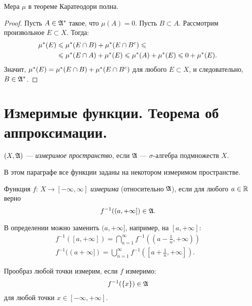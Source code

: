 \begin{remrk}
 Мера $\mu$ в теореме Каратеодори полна.
\end{remrk}
\begin{proof}
 Пусть $A \in \mathfrak{A}^{\ast}$ такое, что $\mu(A) = 0$. Пусть  $B \subset A$. Рассмотрим произвольное $E \subset X$. Тогда:
 \begin{align*}
  \mu^\ast(E) & \leqslant \mu^\ast(E \cap B) + \mu^\ast(E \cap B^{c}) \leqslant \\
  & \leqslant \mu^\ast(E \cap A) + \mu^\ast(E) \leqslant \mu^\ast(A) + \mu^\ast(E) \leqslant 0 + \mu^\ast(E)
 .\end{align*} Значит, $\mu^\ast(E) = \mu^\ast(E \cap B) + \mu^\ast(E \cap B^{c})$ для любого $E \subset X$, и следовательно, $B \in \mathfrak{A}^{\ast}$.
\end{proof}
\section{Измеримые функции. Теорема об аппроксимации.}
\begin{df}
 $(X, \mathfrak{A})$ --- \textit{измеримое пространство}, если  $\mathfrak{A}$ ---  $\sigma$-алгебра подмножеств $X$.
\end{df}
В этом параграфе все функции заданы на некотором измеримом пространстве.
\begin{df}
 Функция $f \colon\, X \to [-\infty, \infty] $ \textit{измерима} (относительно $\mathfrak{A}$), если для любого $a \in \mathbb{R}$ верно
 \begin{align*}
  f^{-1}((a, +\infty]) \in \mathfrak{A}
 .\end{align*}
\end{df}
\begin{remrk}
 В определении можно заменить $(a, +\infty]$, например, на  $[a, +\infty]$:
 \begin{align*}
  f^{-1}([a, +\infty]) = \bigcap_{n=1}^{\infty} f^{-1}\left(\left(a - \frac{1}{n}, +\infty \right)\right) \\
  f^{-1}((a +\infty]) = \bigcup_{n=1}^{\infty}  f^{-1} \left( [a + \frac{1}{n}, +\infty] \right)
 .\end{align*}
\end{remrk}
\begin{crly}
 Прообраз любой точки измерим, если $f$ измеримо:
 \begin{align*}
  f^{-1}(\left\{ x \right\}) \in \mathfrak{A}
 \end{align*} для любой точки $x \in [-\infty, +\infty]$.
\end{crly}
